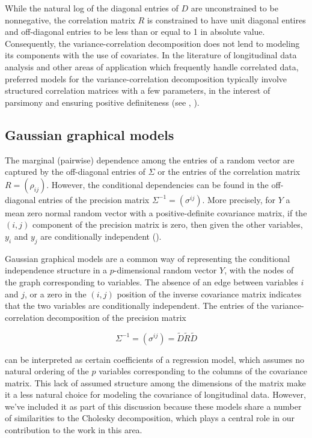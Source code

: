 While the natural log of the diagonal entries of $D$ are unconstrained to be nonnegative, the correlation matrix $R$ is constrained to have unit diagonal entires and off-diagonal entries to be less than or equal to 1 in absolute value. Consequently, the variance-correlation decomposition does not lend to modeling its components with the use of covariates. In the literature of longitudinal data analysis and other areas of application which frequently handle correlated data, preferred models for the variance-correlation decomposition typically involve structured correlation matrices with a few parameters, in the interest of parsimony and ensuring positive definiteness (see \citep{zimmerman1997structured}, \citep{diggle2002analysis}).


\subsection{Gaussian graphical models} 

The marginal (pairwise) dependence among the entries of a random vector are captured by the off-diagonal entries of $\Sigma$ or the entries of the correlation matrix $R = \left(\rho_{ij}\right)$. However, the conditional dependencies can be found in the off-diagonal entries of the precision matrix $\Sigma^{-1} = \left( \sigma^{ij} \right)$. More precisely, for $Y$ a mean zero normal random vector with a positive-definite covariance matrix, if the $\left(i,j\right)$ component of the precision matrix is zero, then given the other variables, $y_i$ and $y_j$ are conditionally independent (\cite{Anderson84a}). 

\bigskip

Gaussian graphical models are a common way of representing the conditional independence structure in a $p$-dimensional random vector $Y$, with the nodes of the graph corresponding to variables. The absence of an edge between variables $i$ and $j$, or a zero in the $\left(i,j\right)$ position of the inverse covariance matrix indicates that the two variables are conditionally independent. The entries of the variance-correlation decomposition of the precision matrix 

\begin{equation} \label{eq:inverse-covariance-decomposition}
\Sigma^{-1} = \left( \sigma^{ij}\right) = \tilde{D} \tilde{R} \tilde{D} 
\end{equation}

\noindent
can be interpreted as certain coefficients of a regression model, which assumes no natural ordering of the $p$ variables corresponding to the columns of the covariance matrix. This lack of assumed structure among the dimensions of the matrix make it a less natural choice for modeling the covariance of longitudinal data. However, we've included it as part of this discussion because these models share a number of similarities to the Cholesky decomposition, which plays a central role in our contribution to the work in this area. 

